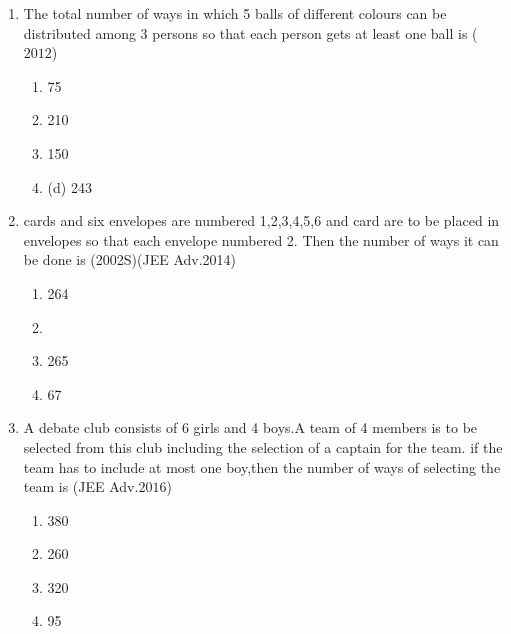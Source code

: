 \documentclass[journal,12pt,twocolumn]{IEEEtran}
\theoremstyle{remark}
\begin{document}
\begin{enumerate}[start=3]
\hfill{($2009$)}\\
\begin{multicols}{2} 
\begin{enumerate}
\item 55\item 77\columnbreak\item  66\item 88
\end{enumerate}
\end{multicols}
\item The total number of ways in which 5 balls of different colours can be distributed among 3 persons so that each person gets at least one ball is
\hfill{($2012$)}\\
\begin{multicols}{2} 
\begin{enumerate}
\item  75\item 210\columnbreak\item150\item (d) 243
\end{enumerate}
\end{multicols}
\item cards and six envelopes are numbered 1,2,3,4,5,6 and card are to be placed in envelopes so that each envelope numbered 2. Then the number of ways it can be done is
\hspace*{\fill}(2002S)(JEE Adv.2014)\\
\begin{multicols}{2} 
\begin{enumerate}
\item  264\item {}\item 265\item  67
\end{enumerate}
\end{multicols}
\item A debate club consists of 6 girls and 4 boys.A team of 4 members is to be selected from this club including the selection of a captain for the team. if the team has to include at most one boy,then the number of ways of selecting the team is
\hfill{(JEE Adv.$2016$)}\\
\begin{multicols}{2} 
\begin{enumerate}
\item  380\item 260\columnbreak\item 320\item  95
\end{enumerate}
\end{multicols}

\end{enumerate}
\end{document}
